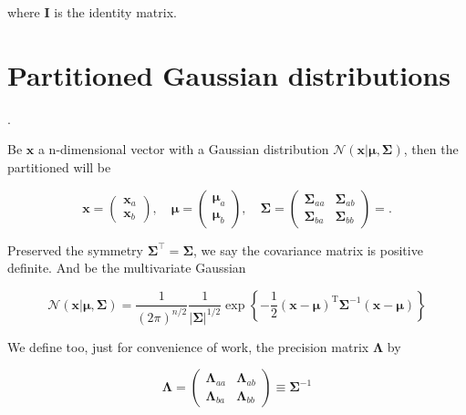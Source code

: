 \begin{appendices}
where $\mathbf{I}$ is the identity matrix.

  \section{Partitioned Gaussian distributions\cite{schon_lindsten}}.

  Be $\mathbf{x}$ a n-dimensional vector with a Gaussian distribution $\mathcal{N}\left( \mathbf{x} | \boldsymbol{\mu}, \boldsymbol{\Sigma} \right)$, then the partitioned will be
  
  \begin{equation}
    \mathbf{x}=
    \begin{pmatrix}
    \mathbf{x}_a \\  
    \mathbf{x}_b 
    \end{pmatrix}
    ,\quad 
    \boldsymbol{\mu}=
    \begin{pmatrix}
      \boldsymbol{\mu}_a \\
      \boldsymbol{\mu}_b
    \end{pmatrix}
    ,\quad 
    \boldsymbol{\Sigma}=
    \begin{pmatrix}
      \boldsymbol{\Sigma}_{aa} & \boldsymbol{\Sigma}_{ab}  \\
      \boldsymbol{\Sigma}_{ba} & \boldsymbol{\Sigma}_{bb}
    \end{pmatrix} = 
    .
  \end{equation}

  Preserved the symmetry $\boldsymbol{\Sigma}^\top = \boldsymbol{\Sigma}$, we say the covariance matrix is positive definite. And be the multivariate Gaussian

  \begin{equation}
    \label{eq:app-par-gau-multivariate-gaussian}
    \mathcal{N}(\mathbf{x} | \boldsymbol{\mu}, \mathbf{\Sigma})=\frac{1}{(2 \pi)^{n / 2}} \frac{1}{|\mathbf{\Sigma}|^{1 / 2}} \exp \left\{-\frac{1}{2}(\mathbf{x}-\boldsymbol{\mu})^{\mathrm{T}} \boldsymbol{\Sigma}^{-1}(\mathbf{x}-\boldsymbol{\mu})\right\}
  \end{equation}

  We define too, just for convenience of work, the precision matrix $\boldsymbol{\Lambda}$ by

  \begin{equation}
    \boldsymbol{\Lambda} = 
    \begin{pmatrix}
      \boldsymbol{\Lambda}_{aa} & \boldsymbol{\Lambda}_{ab}  \\
      \boldsymbol{\Lambda}_{ba} & \boldsymbol{\Lambda}_{bb}
    \end{pmatrix} 
    \equiv \boldsymbol{\Sigma}^{-1}
  \end{equation}


\end{appendices}
